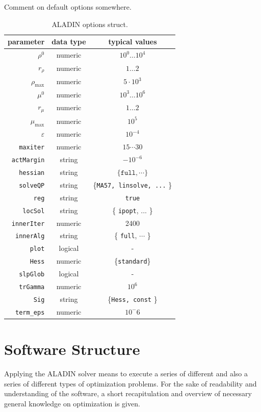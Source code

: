 \documentclass[]{scrartcl}
\newcommand{\Ae}[1]{\color{blue} #1\color{black}}
\begin{document}
 \Ae{Comment on default options somewhere. }
\begin{table}
	\centering
	\begin{tabular}{rcc}
		\hline
parameter & data type & typical values \\ 
\hline
$\rho^0$	& numeric  & $10^0 \dots 10^4$ \\ 
	\hline 
$r_\rho$	& numeric  & $1 \dots 2$ \\ 
	\hline 
$\rho_{\text{max}}$ & numeric & $ 5 \cdot 10^3$ \\
    \hline
$\mu^0$	& numeric  & $10^3 \dots 10^6$ \\ 
	\hline 
$r_\mu$	& numeric  & $1 \dots 2$  \\ 
	\hline 
$\mu_\text{max}$ & numeric & $10^5$ \\
    \hline
$\varepsilon$ & numeric & $10^{-4}$ \\
    \hline
\texttt{maxiter} & numeric & $15 \cdots 30$ \\
    \hline
\texttt{actMargin} & string & $-10^{-6}$ \\
    \hline
\texttt{hessian} & string & $\{\texttt{full}, \cdots \}$\\
    \hline
\texttt{solveQP}    & string  & \{\texttt{MA57, linsolve, ...} \}  \\ 
    \hline 
\texttt{reg} & string & \texttt{true}\\
    \hline
\texttt{locSol}	& string  &\{ \texttt{ipopt}, ... \} \\ 
	\hline 
\texttt{innerIter} & numeric & 2400\\
    \hline
\texttt{innerAlg} & string & \{ \texttt{full}, $\cdots$ \}\\
    \hline
\texttt{plot}	& logical  & -  \\ 
	\hline 
\texttt{Hess} & numeric & \{\texttt{standard}\} \\
    \hline
\texttt{slpGlob} & logical & - \\
    \hline
\texttt{trGamma} & numeric & $10^6$ \\    
    \hline
\texttt{Sig}	& string  & \{\texttt{Hess, const} \} \\ 
	\hline 
\texttt{term\_eps} & numeric & $10^-6$\\
    \hline
\end{tabular} 
\caption{ALADIN options struct.}
\label{tab: ALADIN options struct.}
\end{table}

\section{Software Structure}
Applying the ALADIN solver means to execute a series of different and also a series of different types of optimization problems. For the sake of readability and understanding of the software, a short recapitulation and overview of necessary general knowledge on optimization is given.
\end{document}
